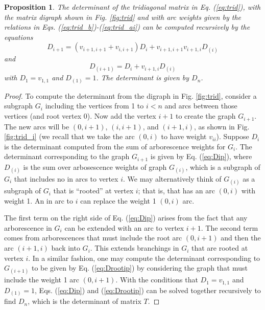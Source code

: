 \documentclass{article}
\newtheorem{proposition}{Proposition}
\begin{document}
\begin{proposition}
    The determinant of the tridiagonal matrix in Eq. (\ref{eq:trid}), with the matrix digraph shown in Fig. \ref{fig:trid} and with arc weights given by the relations in Eqs. (\ref{eq:trid_b})-(\ref{eq:trid_ai}) can be computed recursively by the equations
    \begin{equation}
        D_{i+1} = \left(v_{i+1,i+1} + v_{i,i+1}\right) D_i + v_{i+1, i+1}
        v_{i+1, i} D_{(i)}
        \label{eq:Dip}
    \end{equation}
    and
    \begin{equation}
        D_{(i+1)} = D_i + v_{i+1,i} D_{(i)}
        \label{eq:Drootip}
    \end{equation}
    with $D_1 = v_{1,1}$ and $D_{(1)} = 1$.  The determinant is given by $D_n$.
\end{proposition}
\begin{proof}
    To compute the determinant from the digraph in Fig. \ref{fig:trid}, consider a subgraph $G_i$ including the vertices from 1 to $i < n$ and arcs between those vertices (and root vertex 0).  Now add the vertex $i+1$ to create the graph $G_{i+1}$.  The new arcs will be $(0, i+1)$, $(i, i+1)$, and $(i+1,i)$, as shown in Fig. \ref{fig:trid_i} (we recall that we take the arc $(0, i)$ to have weight $v_{ii}$).  Suppose $D_i$ is the determinant computed from the sum of arborescence weights for $G_i$.  The determinant corresponding to the graph $G_{i+1}$ is given by Eq. (\ref{eq:Dip}), where $D_{(i)}$ is the sum over arbosescence weights of graph $G_{(i)}$, which is a subgraph of $G_i$ that includes no in arcs to vertex $i$.  We may alternatively think of $G_{(i)}$ as a subgraph of $G_i$ that is ``rooted'' at vertex $i$; that is, that has an arc $(0,i)$ with weight 1.  An in arc to $i$ can replace the weight 1 $(0,i)$ arc.
    
    The first term on the right side of Eq. (\ref{eq:Dip}) arises from the fact that any arborescence in $G_i$ can be extended with an arc to vertex $i+1$.  The second term comes from arborescences that must include the root arc $(0, i+1)$ and then the arc $(i+1,i)$ back into $G_i$.  This extends branchings in $G_i$ that are rooted at vertex $i$.  In a similar fashion, one may compute the determinant corresponding to $G_{(i+1)}$ to be given by Eq. (\ref{eq:Drootip}) by considering the graph that must include the weight 1 arc $(0, i+1)$.  With the conditions that $D_1 = v_{1,1}$ and $D_{(1)} = 1$, Eqs. (\ref{eq:Dip}) and (\ref{eq:Drootip}) can be solved together recursively to find $D_n$, which is the determinant of matrix $T$.
\end{proof}
\end{document}
